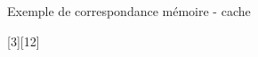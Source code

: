 %
\begin{Frame}{Exemple de correspondance mémoire - cache}


 \vspace{-0,8cm}
        \begin{center}
       [3][12] \hspace{2cm}
        \end{center}

 

\end{Frame}


